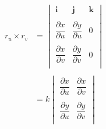 \documentclass[11pt,a4paper]{article}
\theoremstyle{definition}
\begin{document}
\begin{align*}
r_u \times r_v & = \begin{vmatrix}
\textbf{i} & \textbf{j} & \textbf{k}\\\\
\dfrac{\partial x}{\partial u} & \dfrac{\partial y}{\partial u} & 0\\\\
\dfrac{\partial x}{\partial v} & \dfrac{\partial y}{\partial v} & 0\\
\end{vmatrix}\\\\
& = k \begin{vmatrix}
\dfrac{\partial x}{\partial u} & \dfrac{\partial x}{\partial v}\\\\
\dfrac{\partial y}{\partial u} & \dfrac{\partial y}{\partial v}\\
\end{vmatrix}\\\\\\\\\\
\end{align*}
\end{document}
